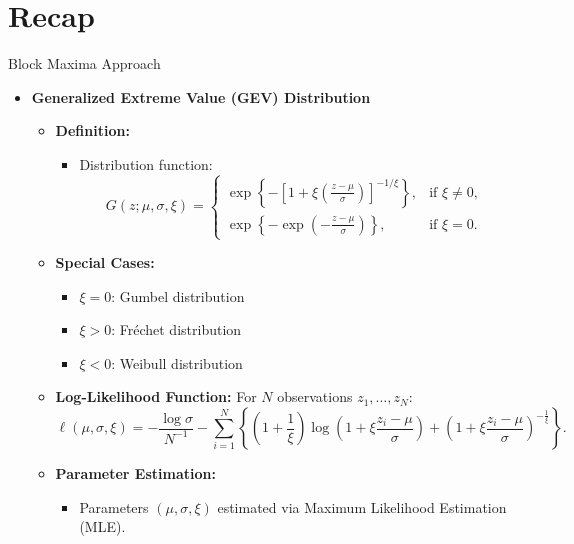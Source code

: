 \documentclass[10pt, hyperref={colorlinks = true,linkcolor = blue}]{beamer}
\begin{document}
{{\section{Recap}
\begin{frame}{Block Maxima Approach}
\begin{itemize}
    \item \textbf{Generalized Extreme Value (GEV) Distribution}
    \begin{itemize}
        \item \textbf{Definition:}
        \begin{itemize}
            \item Distribution function: 
            \[
            G(z; \mu, \sigma, \xi) =
            \begin{cases}
                \exp\left\{ -\left[1 + \xi\left(\frac{z - \mu}{\sigma}\right)\right]^{-1/\xi} \right\}, & \text{if } \xi \neq 0, \\
                \exp\left\{ -\exp\left(-\frac{z - \mu}{\sigma}\right) \right\}, & \text{if } \xi = 0.
            \end{cases}
            \]
        \end{itemize}
        
        \item \textbf{Special Cases:}
        \begin{itemize}
            \item \(\xi = 0\): Gumbel distribution
            \item \(\xi > 0\): Fréchet distribution
            \item \(\xi < 0\): Weibull distribution
        \end{itemize}
        
        \item \textbf{Log-Likelihood Function:}
       For \(N\) observations \(z_1, \ldots, z_N\):
            \[
            \ell(\mu, \sigma, \xi) = -\frac{\log \sigma} {N^{-1}}
            - 
            \sum_{i=1}^{N}\left\{ \left(1 + \frac{1}{\xi}\right)  \log \left(1 + \xi \frac{z_i - \mu}{\sigma}\right)
            + \left(1 + \xi \frac{z_i - \mu}{\sigma}\right)^{-\frac{1}{\xi}}\right\}.
            \]
       
        
        \item \textbf{Parameter Estimation:}
        \begin{itemize}
            \item Parameters \((\mu, \sigma, \xi)\) estimated via Maximum Likelihood Estimation (MLE).
        \end{itemize}
        

\end{itemize}
\end{itemize}
\end{frame}}}
\end{document}
